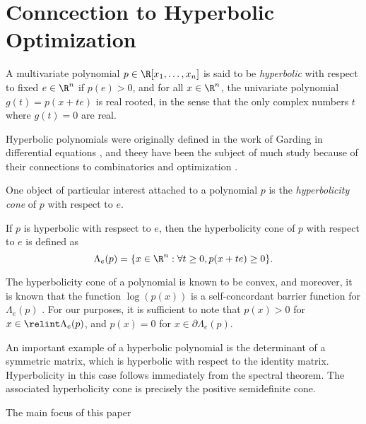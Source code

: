 \section{Conncection to Hyperbolic Optimization}
A multivariate polynomial $p \in \R[x_1 ,\dots, x_n]$ is said to be \emph{hyperbolic} with respect to fixed $e \in \R^n$ if $p(e) > 0$, and for all $x \in \R^n$, the univariate polynomial $g(t) = p(x+te)$ is real rooted, in the sense that the only complex numbers $t$ where $g(t) = 0$ are real.

Hyperbolic polynomials were originally defined in the work of Garding in differential equations \cite{TODO}, and theey have been the subject of much study because of their connections to combinatorics and optimization \cite{TODO}.

One object of particular interest attached to a polynomial $p$ is the \emph{hyperbolicity cone} of $p$ with respect to $e$.

If $p$ is hyperbolic with respsect to $e$, then the hyperbolicity cone of $p$ with respect to $e$ is defined as
\[
    \Lambda_e(p) = \{x \in \R^n : \forall t \ge 0, p(x+te) \ge 0\}.
\]

The hyperbolicity cone of a polynomial is known to be convex, and moreover, it is known that the function $\log(p(x))$ is a self-concordant barrier function for $\Lambda_e(p)$ \cite{TODO}. 
For our purposes, it is sufficient to note that $p(x) > 0$ for $x \in \relint\Lambda_e(p)$, and $p(x) = 0$ for $x \in \partial \Lambda_e(p)$.

An important example of a hyperbolic polynomial is the determinant of a symmetric matrix, which is hyperbolic with respect to the identity matrix. Hyperbolicity in this case follows immediately from the spectral theorem. The associated hyperbolicity cone is precisely the positive semidefinite cone.

The main focus of this paper 
